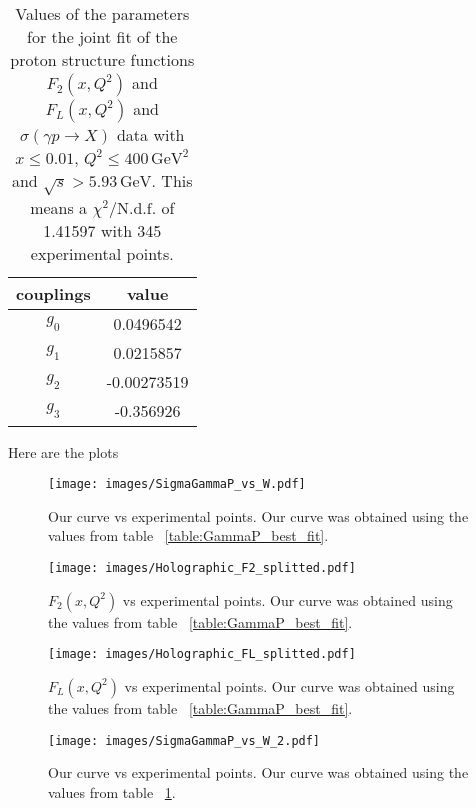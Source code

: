 \documentclass[preprint, 12pt]{elsarticle}
\begin{document}
\begin{table}[b!]
\centering
\caption{Values of the parameters for the joint fit of the proton structure functions $F_2\left(x, Q^2\right)$ and $F_L\left(x, Q^2\right)$ and $\sigma\left(\gamma p \rightarrow X\right)$ data with $x \leq 0.01$, $Q^2 \leq 400 \, \text{GeV}^2$ and $\sqrt{s} > 5.93 \, \text{GeV}$. This means a $\chi^2 / \text{N.d.f.}$ of 1.41597 with 345 experimental points.}
\vspace{0.5cm}
\begin{tabular}{|c|c|}
\hline
couplings   & value \\
\hline
$g_0$  & 0.0496542\\ 
\hline
$g_1$  & 0.0215857 \\ 
\hline
$g_2$  & -0.00273519  \\
\hline
$g_3$  & -0.356926\\ 
\hline
\end{tabular}
\label{table:GammaP_best_fit_2}
\end{table}

Here are the plots

\begin{figure}[!h]
\center
\texttt{[image: images/SigmaGammaP\_vs\_W.pdf]} 
\caption{Our curve vs experimental points. Our curve was obtained using the values from table ~\ref{table:GammaP_best_fit}.}
\label{fig:GammaP_best_fit}
\end{figure}

\begin{figure}[!h]
\center
\texttt{[image: images/Holographic\_F2\_splitted.pdf]} 
\caption{$F_2\left(x,Q^2\right)$ vs experimental points. Our curve was obtained using the values from table ~\ref{table:GammaP_best_fit}.}
\label{fig:F2_best_fit}
\end{figure}

\begin{figure}[!h]
\center
\texttt{[image: images/Holographic\_FL\_splitted.pdf]} 
\caption{$F_L\left(x,Q^2\right)$ vs experimental points. Our curve was obtained using the values from table ~\ref{table:GammaP_best_fit}.}
\label{fig:FL_best_fit}
\end{figure}


\begin{figure}[!h]
\center
\texttt{[image: images/SigmaGammaP\_vs\_W\_2.pdf]} 
\caption{Our curve vs experimental points. Our curve was obtained using the values from table ~\ref{table:GammaP_best_fit_2}.}
\label{fig:GammaP_best_fit_2}
\end{figure}
\end{document}
